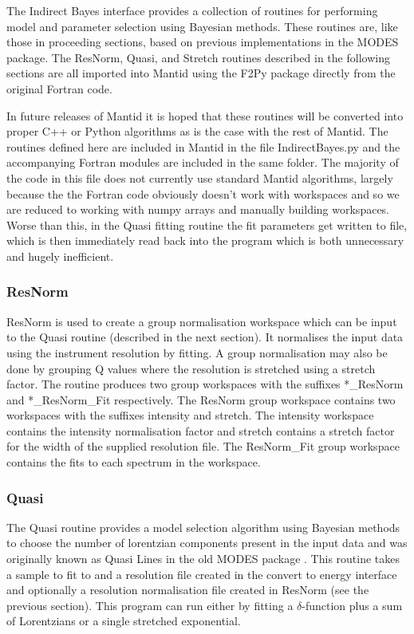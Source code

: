 \documentclass[paper=a4, fontsize=11pt]{scrartcl}	%
\numberwithin{equation}{section}															%
\numberwithin{figure}{section}																%
\numberwithin{table}{section}																%
\begin{document}
The Indirect Bayes interface provides a collection of routines for performing model and parameter selection using Bayesian methods. These routines are, like those in proceeding sections, based on previous implementations in the MODES package. The ResNorm, Quasi, and Stretch routines described in the following sections are all imported into Mantid using the F2Py package directly from the original Fortran code. 

In future releases of Mantid it is hoped that these routines will be converted into proper C++ or Python algorithms as is the case with the rest of Mantid. The routines defined here are included in Mantid in the file IndirectBayes.py and the accompanying Fortran modules  are included in the same folder. The majority of the code in this file does not currently use standard Mantid algorithms, largely because the the Fortran code obviously doesn't work with workspaces and so we are reduced to working with numpy arrays and manually building workspaces. Worse than this, in the Quasi fitting routine the fit parameters get written to file, which is then immediately read back into the program which is both unnecessary and hugely inefficient.

\subsubsection{ResNorm}
ResNorm is used to create a group normalisation workspace which can be input to the Quasi routine (described in the next section). It normalises the input data using the instrument resolution by fitting. A group normalisation may also be done by grouping Q values where the resolution is stretched using a stretch factor. The routine produces two group workspaces with the suffixes \**\_ResNorm and \**\_ResNorm\_Fit respectively. The ResNorm group workspace contains two workspaces with the suffixes intensity and stretch. The intensity workspace contains the intensity normalisation factor and stretch contains a stretch factor for the width of the supplied resolution file. The ResNorm\_Fit group workspace contains the fits to each spectrum in the workspace.

\subsubsection{Quasi}
The Quasi routine provides a model selection algorithm using Bayesian methods to choose the number of lorentzian components present in the input data \citep{dssivia1992} and was originally known as Quasi Lines in the old MODES package \citep{wshowells2010}. This routine takes a sample to fit to and a resolution file created in the convert to energy interface and optionally a resolution normalisation file created in ResNorm (see the previous section). This program can run either by fitting a $\delta$-function plus a sum of Lorentzians or a single stretched exponential.
\end{document}
